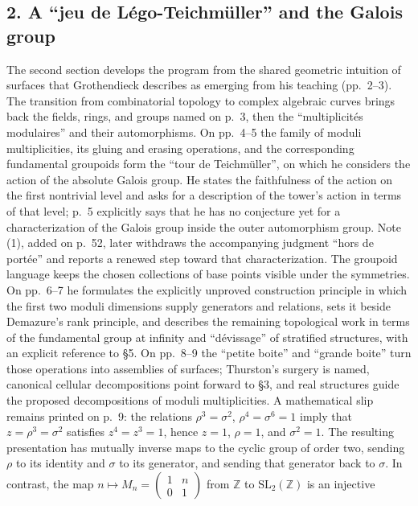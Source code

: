 \subsection*{2. A ``jeu de Légo-Teichmüller'' and the Galois group}
The second section develops the program from the shared geometric
intuition of surfaces that Grothendieck describes as emerging from his
teaching (pp.~2--3). The transition from combinatorial topology to complex
algebraic curves brings back the fields, rings, and groups named on p.~3,
then the ``multiplicités modulaires'' and their automorphisms. On
pp.~4--5 the family of moduli multiplicities, its gluing and erasing
operations, and the corresponding fundamental groupoids form the
``tour de Teichmüller'', on which he considers the action of the absolute
Galois group. He states the faithfulness of the action on the first
nontrivial level and asks for a description of the tower's action in terms
of that level; p.~5 explicitly says that he has no conjecture yet for a
characterization of the Galois group inside the outer automorphism group.
Note (1), added on p.~52, later withdraws the accompanying judgment
``hors de portée'' and reports a renewed step toward that characterization.
The groupoid language keeps the chosen collections of base points visible
under the symmetries. On pp.~6--7 he formulates the explicitly unproved construction principle
in which the first two moduli dimensions supply generators and relations,
sets it beside Demazure's rank principle, and describes the remaining
topological work in terms of the fundamental group at infinity and
``dévissage'' of stratified structures, with an explicit reference to
\S5. On pp.~8--9 the ``petite boite'' and ``grande boite'' turn those
operations into assemblies of surfaces; Thurston's surgery is named,
canonical cellular decompositions point forward to \S3, and real
structures guide the proposed decompositions of moduli multiplicities.
A mathematical slip remains printed on p.~9: the relations
$\rho^3=\sigma^2$, $\rho^4=\sigma^6=1$ imply that
$z=\rho^3=\sigma^2$ satisfies $z^4=z^3=1$, hence $z=1$,
$\rho=1$, and $\sigma^2=1$. The resulting presentation has mutually
inverse maps to the cyclic group of order two, sending $\rho$ to its
identity and $\sigma$ to its generator, and sending that generator back
to $\sigma$. In contrast, the map
$n\longmapsto M_n=\left(\begin{smallmatrix}1&n\\0&1\end{smallmatrix}\right)$
from $\mathbb Z$ to $\mathrm{SL}_2(\mathbb Z)$ is an injective
